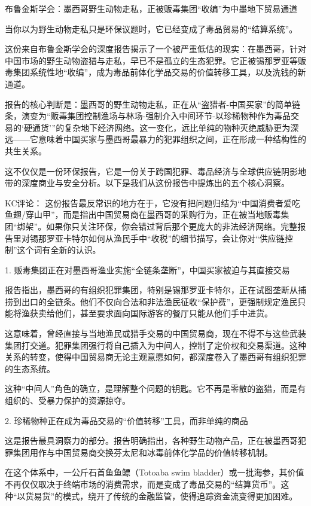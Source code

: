 \documentclass[11pt]{ctexart}
\begin{document}
布鲁金斯学会：墨西哥野生动物走私，正被贩毒集团“收编”为中墨地下贸易通道

当你以为野生动物走私只是环保议题时，它已经变成了毒品贸易的“结算系统”。

这份来自布鲁金斯学会的深度报告揭示了一个被严重低估的现实：在墨西哥，针对中国市场的野生动物盗猎与走私，早已不是孤立的生态犯罪。它正被锡那罗亚等贩毒集团系统性地“收编”，成为毒品前体化学品交易的价值转移工具，以及洗钱的新通道。

报告的核心判断是：墨西哥的野生动物走私，正在从“盗猎者-中国买家”的简单链条，演变为“贩毒集团控制渔场与林场-强制介入中间环节-以珍稀物种作为毒品交易的‘硬通货’”的复杂地下经济网络。这一变化，远比单纯的物种灭绝威胁更为深远——它意味着中国买家与墨西哥最暴力的犯罪组织之间，正在形成一种结构性的共生关系。

这不仅仅是一份环保报告，它是一份关于跨国犯罪、毒品经济与全球供应链阴影地带的深度商业与安全分析。以下是我们从这份报告中提炼出的五个核心洞察。

KC评论： 这份报告最反常识的地方在于，它没有把问题归结为“中国消费者爱吃鱼翅/穿山甲”，而是指出中国贸易商在墨西哥的采购行为，正在被当地贩毒集团“绑架”。如果你只关注环保，你会错过背后那个更庞大的非法经济网络。完整报告里对锡那罗亚卡特尔如何从渔民手中“收税”的细节描写，会让你对“供应链控制”这个词有全新的认识。

1. 贩毒集团正在对墨西哥渔业实施“全链条垄断”，中国买家被迫与其直接交易

报告指出，墨西哥的有组织犯罪集团，特别是锡那罗亚卡特尔，正在试图垄断从捕捞到出口的全链条。他们不仅向合法和非法渔民征收“保护费”，更强制规定渔民只能将渔获卖给他们，甚至要求面向国际游客的餐厅只能从他们手中进货。

这意味着，曾经直接与当地渔民或猎手交易的中国贸易商，现在不得不与这些武装集团打交道。犯罪集团强行将自己插入为中间人，控制了定价权和交易渠道。这种关系的转变，使得中国贸易商无论主观意愿如何，都深度卷入了墨西哥有组织犯罪的生态系统。

这种“中间人”角色的确立，是理解整个问题的钥匙。它不再是零散的盗猎，而是有组织的、受暴力保护的资源掠夺。

2. 珍稀物种正在成为毒品交易的“价值转移”工具，而非单纯的商品

这是报告最具洞察力的部分。报告明确指出，各种野生动物产品，正在被墨西哥犯罪集团用作与中国贸易商交换芬太尼和冰毒前体化学品的价值转移机制。

在这个体系中，一公斤石首鱼鱼鳔（Totoaba swim bladder）或一批海参，其价值不再仅仅取决于终端市场的消费需求，而是变成了毒品交易的“结算货币”。这种“以货易货”的模式，绕开了传统的金融监管，使得追踪资金流变得更加困难。
\end{document}

